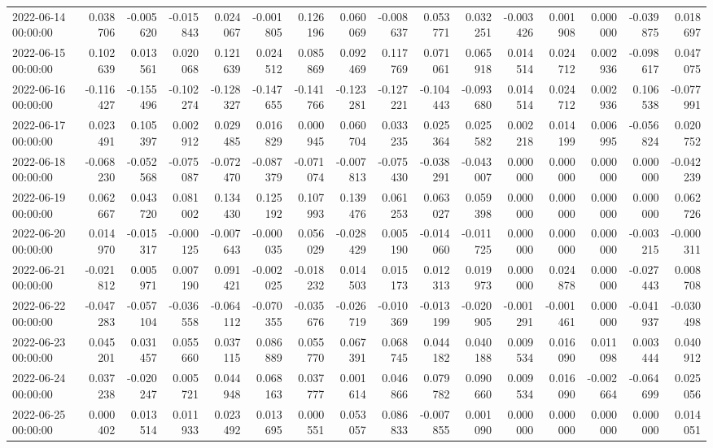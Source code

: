 \begin{tabular}{lrrrrrrrrrrrrrrr}
2022-06-14 00:00:00 & 0.038706 & -0.005620 & -0.015843 & 0.024067 & -0.001805 & 0.126196 & 0.060069 & -0.008637 & 0.053771 & 0.032251 & -0.003426 & 0.001908 & 0.000000 & -0.039875 & 0.018697 \\
2022-06-15 00:00:00 & 0.102639 & 0.013561 & 0.020068 & 0.121639 & 0.024512 & 0.085869 & 0.092469 & 0.117769 & 0.071061 & 0.065918 & 0.014514 & 0.024712 & 0.002936 & -0.098617 & 0.047075 \\
2022-06-16 00:00:00 & -0.116427 & -0.155496 & -0.102274 & -0.128327 & -0.147655 & -0.141766 & -0.123281 & -0.127221 & -0.104443 & -0.093680 & 0.014514 & 0.024712 & 0.002936 & 0.106538 & -0.077991 \\
2022-06-17 00:00:00 & 0.023491 & 0.105397 & 0.002912 & 0.029485 & 0.016829 & 0.000945 & 0.060704 & 0.033235 & 0.025364 & 0.025582 & 0.002218 & 0.014199 & 0.006995 & -0.056824 & 0.020752 \\
2022-06-18 00:00:00 & -0.068230 & -0.052568 & -0.075087 & -0.072470 & -0.087379 & -0.071074 & -0.007813 & -0.075430 & -0.038291 & -0.043007 & 0.000000 & 0.000000 & 0.000000 & 0.000000 & -0.042239 \\
2022-06-19 00:00:00 & 0.062667 & 0.043720 & 0.081002 & 0.134430 & 0.125192 & 0.107993 & 0.139476 & 0.061253 & 0.063027 & 0.059398 & 0.000000 & 0.000000 & 0.000000 & 0.000000 & 0.062726 \\
2022-06-20 00:00:00 & 0.014970 & -0.015317 & -0.000125 & -0.007643 & -0.000035 & 0.056029 & -0.028429 & 0.005190 & -0.014060 & -0.011725 & 0.000000 & 0.000000 & 0.000000 & -0.003215 & -0.000311 \\
2022-06-21 00:00:00 & -0.021812 & 0.005971 & 0.007190 & 0.091421 & -0.002025 & -0.018232 & 0.014503 & 0.015173 & 0.012313 & 0.019973 & 0.000000 & 0.024878 & 0.000000 & -0.027443 & 0.008708 \\
2022-06-22 00:00:00 & -0.047283 & -0.057104 & -0.036558 & -0.064112 & -0.070355 & -0.035676 & -0.026719 & -0.010369 & -0.013199 & -0.020905 & -0.001291 & -0.001461 & 0.000000 & -0.041937 & -0.030498 \\
2022-06-23 00:00:00 & 0.045201 & 0.031457 & 0.055660 & 0.037115 & 0.086889 & 0.055770 & 0.067391 & 0.068745 & 0.044182 & 0.040188 & 0.009534 & 0.016090 & 0.011098 & 0.003444 & 0.040912 \\
2022-06-24 00:00:00 & 0.037238 & -0.020247 & 0.005721 & 0.044948 & 0.068163 & 0.037777 & 0.001614 & 0.046866 & 0.079782 & 0.090660 & 0.009534 & 0.016090 & -0.002664 & -0.064699 & 0.025056 \\
2022-06-25 00:00:00 & 0.000402 & 0.013514 & 0.011933 & 0.023492 & 0.013695 & 0.000551 & 0.053057 & 0.086833 & -0.007855 & 0.001090 & 0.000000 & 0.000000 & 0.000000 & 0.000000 & 0.014051 \\

\end{tabular}

